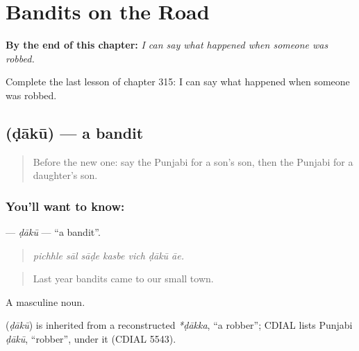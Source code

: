 
\chapter{Bandits on the Road}
\label{ch:pa-a2-bandits-on-the-road}

\begin{chapteropening}
\textbf{By the end of this chapter:} \emph{I can say what happened when someone was robbed.}

Complete the last lesson of chapter 315: I can say what happened when someone was robbed.
\end{chapteropening}

\section[\texorpdfstring{\pa{ਡਾਕੂ} (ḍākū)}{ਡਾਕੂ (ḍākū)}]{ (ḍākū) — a bandit}

\label{lesson:PA-C315-daku}



\begin{quote}
Before the new one: say the Punjabi for a son's son, then the Punjabi for a daughter's son.
\end{quote}

\subsection*{You'll want to know: }
\textbf{} — \emph{ḍākū} — \textquotedblleft{}a bandit\textquotedblright{}.

\begin{quote}
      
\end{quote}

\begin{quote}
\emph{pichhle sāl sāḍe kasbe vich ḍākū āe.}
\end{quote}

\begin{quote}
Last year bandits came to our small town.
\end{quote}

A masculine noun.

\begin{cousinweb}
\textbf{} (\emph{ḍākū}) is inherited from a reconstructed \emph{*ḍākka}, \textquotedblleft{}a robber\textquotedblright{}; CDIAL lists Punjabi \emph{ḍākū}, \textquotedblleft{}robber\textquotedblright{}, under it (CDIAL 5543).
\end{cousinweb}

